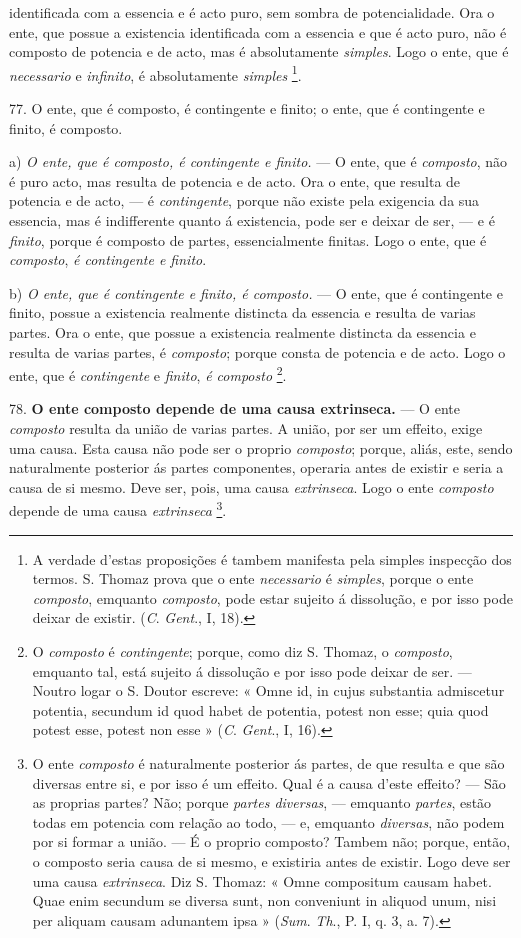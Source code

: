  identificada com a essencia e é acto puro, sem sombra de potencialidade. Ora o ente, que possue a existencia identificada com a essencia e que é acto puro, não é composto de potencia e de acto, mas é absolutamente \emph{simples}. Logo o ente, que é \emph{necessario} e \emph{infinito}, é absolutamente \emph{simples} \footnote{A verdade d'estas proposições é tambem manifesta pela simples inspecção dos termos. S. Thomaz prova que o ente \emph{necessario} é \emph{simples}, porque o ente \emph{composto}, emquanto \emph{composto}, pode estar sujeito á dissolução, e por isso pode deixar de existir. (\emph{C}. \emph{Gent}., I, 18).}.

77. O ente, que é composto, é contingente e finito; o ente, que é contingente e finito, é composto.

a) \emph{O ente, que é composto, é contingente e finito.} --- O ente, que é \emph{composto}, não é puro acto, mas resulta de potencia e de acto. Ora o ente, que resulta de potencia e de acto, --- é \emph{contingente}, porque não existe pela exigencia da sua essencia, mas é indifferente quanto á existencia, pode ser e deixar de ser, --- e é \emph{finito}, porque é composto de partes, essencialmente finitas. Logo o ente, que é \emph{composto}, \emph{é contingente e finito}.

b) \emph{O ente, que é contingente e finito, é composto.} --- O ente, que é contingente e finito, possue a existencia realmente distincta da essencia e resulta de varias partes. Ora o ente, que possue a existencia realmente distincta da essencia e resulta de varias partes, é \emph{composto}; porque consta de potencia e de acto. Logo o ente, que é \emph{contingente} e \emph{finito}, \emph{é composto} \footnote{O \emph{composto} é \emph{contingente}; porque, como diz S. Thomaz, o \emph{composto}, emquanto tal, está sujeito á dissolução e por isso pode deixar de ser. --- Noutro logar o S. Doutor escreve: « Omne id, in cujus substantia admiscetur potentia, secundum id quod habet de potentia, potest non esse; quia quod potest esse, potest non esse » (\emph{C}. \emph{Gent}., I, 16).}.

78. \textbf{O ente composto depende de uma causa extrinseca.} --- O ente \emph{composto} resulta da união de varias partes. A união, por ser um effeito, exige uma causa. Esta causa não pode ser o proprio \emph{composto}; porque, aliás, este, sendo naturalmente posterior ás partes componentes, operaria antes de existir e seria a causa de si mesmo. Deve ser, pois, uma causa \emph{extrinseca}. Logo o ente \emph{composto} depende de uma causa \emph{extrinseca} \footnote{O ente \emph{composto} é naturalmente posterior ás partes, de que resulta e que são diversas entre si, e por isso é um effeito. Qual é a causa d'este effeito? --- São as proprias partes? Não; porque \emph{partes diversas}, --- emquanto \emph{partes}, estão todas em potencia com relação ao todo, --- e, emquanto \emph{diversas}, não podem por si formar a união. --- É o proprio composto? Tambem não; porque, então, o composto seria causa de si mesmo, e existiria antes de existir. Logo deve ser uma causa \emph{extrinseca}. Diz S. Thomaz: « Omne compositum causam habet. Quae enim secundum se diversa sunt, non conveniunt in aliquod unum, nisi per aliquam causam adunantem ipsa » (\emph{Sum}. \emph{Th}., P. I, q. 3, a. 7).}.
